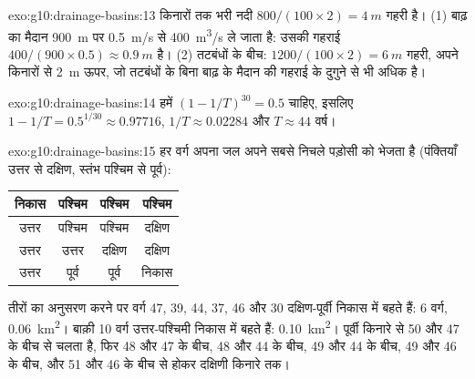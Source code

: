 \begin{solution}{exo:g10:drainage-basins:13}
किनारों तक भरी नदी $800/(100 \times 2) = \qty{4}{m}$ गहरी है।
(1) बाढ़ का मैदान \qty{900}{m} पर \qty{0.5}{m/s} से
\qty{400}{m^3/s} ले जाता है: उसकी गहराई $400/(900 \times 0.5) \approx \qty{0.9}{m}$ है।
(2) तटबंधों के बीच: $1200/(100 \times 2) = \qty{6}{m}$ गहरी, अपने किनारों से \qty{2}{m}
ऊपर, जो तटबंधों के बिना बाढ़ के मैदान की गहराई के दुगुने से भी
अधिक है।
\end{solution}

\begin{solution}{exo:g10:drainage-basins:14}
हमें $(1 - 1/T)^{30} = 0.5$ चाहिए, इसलिए $1 - 1/T = 0.5^{1/30} \approx 0.97716$,
$1/T \approx 0.02284$ और $T \approx 44$ वर्ष।
\end{solution}

\begin{solution}{exo:g10:drainage-basins:15}
हर वर्ग अपना जल अपने सबसे निचले पड़ोसी को भेजता है (पंक्तियाँ उत्तर से दक्षिण,
स्तंभ पश्चिम से पूर्व):
\begin{center}
\begin{tabular}{|c|c|c|c|}
\hline
निकास & पश्चिम & पश्चिम & पश्चिम \\ \hline
उत्तर & पश्चिम & पश्चिम & दक्षिण \\ \hline
उत्तर & उत्तर & दक्षिण & दक्षिण \\ \hline
उत्तर & पूर्व & पूर्व & निकास \\ \hline
\end{tabular}
\end{center}
तीरों का अनुसरण करने पर वर्ग 47, 39, 44, 37, 46 और 30
दक्षिण-पूर्वी निकास में बहते हैं: 6 वर्ग, \qty{0.06}{km^2}। बाक़ी 10 वर्ग
उत्तर-पश्चिमी निकास में बहते हैं: \qty{0.10}{km^2}।  पूर्वी
किनारे से 50 और 47 के बीच से चलता है, फिर 48 और 47 के बीच, 48 और 44 के बीच,
49 और 44 के बीच, 49 और 46 के बीच, और 51 और 46 के बीच से होकर दक्षिणी किनारे तक।
\end{solution}

